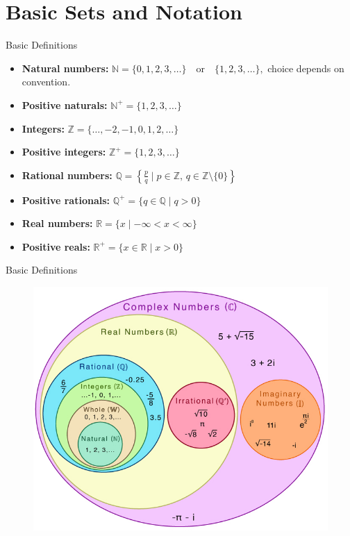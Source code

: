 
\graphicspath{{./images/png}{./images/png/lecture-01}}
\date{13 October 2025}



\begin{frame}
  \cmctitleframe
\end{frame}

\section{Basic Sets and Notation}

\begin{frame}{Basic Definitions}
\begin{itemize}
  \item \textbf{Natural numbers:} 
     $\mathbb{N} = \{0,1,2,3,\dots\} \quad\text{or}\quad \{1,2,3,\dots\},$ choice depends on convention.
  \item \textbf{Positive naturals:}  $\mathbb{N}^{+} = \{1,2,3,\dots\}$
  \item \textbf{Integers:} $\mathbb{Z} = \{\dots,-2,-1,0,1,2,\dots\}$
  \item \textbf{Positive integers:}  $\mathbb{Z}^{+} = \{1,2,3,\dots\}$
  \item \textbf{Rational numbers:} $\mathbb{Q} = \left\{ \frac{p}{q} \mid p \in \mathbb{Z},\, q \in \mathbb{Z}\setminus\{0\} \right\}$
  \item \textbf{Positive rationals:} $\mathbb{Q}^{+} = \{q \in \mathbb{Q} \mid q > 0\}$
  \item \textbf{Real numbers:} $\mathbb{R} = \{ x \mid -\infty < x < \infty \}$
  \item \textbf{Positive reals:} $\mathbb{R}^{+} = \{ x \in \mathbb{R} \mid x > 0\}$
\end{itemize}
\end{frame}

\begin{frame}{Basic Definitions}
\begin{figure}
    \centering
    \includegraphics[width=0.7\linewidth]{Number-Sets-Venn-Diagram.png}
\end{figure}

\end{frame}

